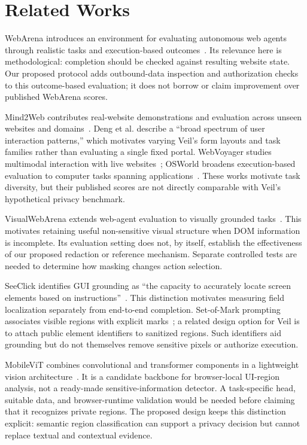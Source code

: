 \documentclass[conference]{IEEEtran}
\begin{document}
\section{Related Works}
WebArena introduces an environment for evaluating autonomous web agents through realistic tasks and execution-based outcomes~\cite{webarena}. Its relevance here is methodological: completion should be checked against resulting website state. Our proposed protocol adds outbound-data inspection and authorization checks to this outcome-based evaluation; it does not borrow or claim improvement over published WebArena scores.

Mind2Web contributes real-website demonstrations and evaluation across unseen websites and domains~\cite{mind2web}. Deng et al. describe a ``broad spectrum of user interaction patterns,'' which motivates varying Veil's form layouts and task families rather than evaluating a single fixed portal. WebVoyager studies multimodal interaction with live websites~\cite{webvoyager}; OSWorld broadens execution-based evaluation to computer tasks spanning applications~\cite{osworld}. These works motivate task diversity, but their published scores are not directly comparable with Veil's hypothetical privacy benchmark.

VisualWebArena extends web-agent evaluation to visually grounded tasks~\cite{visualwebarena}. This motivates retaining useful non-sensitive visual structure when DOM information is incomplete. Its evaluation setting does not, by itself, establish the effectiveness of our proposed redaction or reference mechanism. Separate controlled tests are needed to determine how masking changes action selection.

SeeClick identifies GUI grounding as ``the capacity to accurately locate screen elements based on instructions''~\cite{seeclick}. This distinction motivates measuring field localization separately from end-to-end completion. Set-of-Mark prompting associates visible regions with explicit marks~\cite{som}; a related design option for Veil is to attach public element identifiers to sanitized regions. Such identifiers aid grounding but do not themselves remove sensitive pixels or authorize execution.

MobileViT combines convolutional and transformer components in a lightweight vision architecture~\cite{mobilevit}. It is a candidate backbone for browser-local UI-region analysis, not a ready-made sensitive-information detector. A task-specific head, suitable data, and browser-runtime validation would be needed before claiming that it recognizes private regions. The proposed design keeps this distinction explicit: semantic region classification can support a privacy decision but cannot replace textual and contextual evidence.
\end{document}
